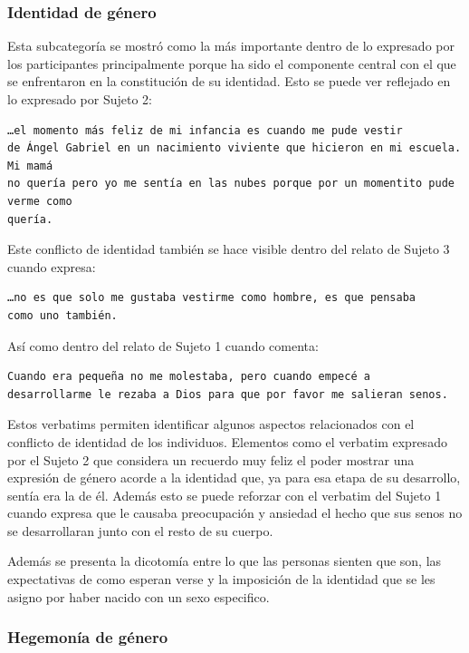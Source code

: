 \subsubsection{Identidad de género}

Esta subcategoría se mostró como la más importante dentro de lo expresado por
los participantes principalmente porque ha sido el componente central con
el que se enfrentaron en la constitución de su identidad. Esto se puede ver
reflejado en lo expresado por Sujeto 2:

\begin{verbatim}
…el momento más feliz de mi infancia es cuando me pude vestir
de Ángel Gabriel en un nacimiento viviente que hicieron en mi escuela. Mi mamá
no quería pero yo me sentía en las nubes porque por un momentito pude verme como
quería.
\end{verbatim}

Este conflicto de identidad también se hace visible dentro del relato de Sujeto
3 cuando expresa:

\begin{verbatim}
…no es que solo me gustaba vestirme como hombre, es que pensaba
como uno también.
\end{verbatim}

Así como dentro del relato de Sujeto 1 cuando comenta:

\begin{verbatim}
Cuando era pequeña no me molestaba, pero cuando empecé a
desarrollarme le rezaba a Dios para que por favor me salieran senos.
\end{verbatim}

Estos verbatims permiten identificar algunos aspectos relacionados con el
conflicto de identidad de los individuos. Elementos como el verbatim expresado
por el Sujeto 2 que considera un recuerdo muy feliz el poder mostrar una
expresión de género acorde a la identidad que, ya para esa etapa de su
desarrollo, sentía era la de él. Además esto se puede reforzar con el verbatim
del Sujeto 1 cuando expresa que le causaba preocupación y ansiedad el hecho que
sus senos no se desarrollaran junto con el resto de su cuerpo.

Además se presenta la dicotomía entre lo que las personas sienten que son, las
expectativas de como esperan verse y la imposición de la identidad que se
les asigno por haber nacido con un sexo especifico.

\subsubsection{Hegemonía de género}

